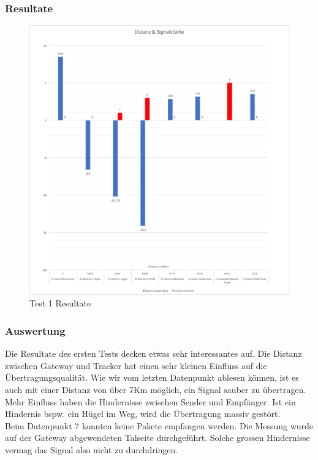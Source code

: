\documentclass[11pt,english,german]{report}
\theoremstyle{definition}
\begin{document}
\subsubsection{Resultate}
\begin{figure}[H]
	\centering
	\includegraphics[width=\textwidth]{img/testing/testing3_lostpackets.png}
	\caption[Test 1 Resultate]
	{Test 1 Resultate}
\end{figure}

\newpage
\subsubsection{Auswertung}
Die Resultate des ersten Tests decken etwas sehr interessantes auf. Die Distanz zwischen Gateway und Tracker hat einen sehr kleinen Einfluss auf die Übertragungsqualität. Wie wir vom letzten Datenpunkt ablesen können, ist es auch mit einer Distanz von über 7Km möglich, ein Signal sauber zu übertragen. Mehr Einfluss haben die Hindernisse zwischen Sender und Empfänger. Ist ein Hindernis bspw. ein Hügel im Weg, wird die Übertragung massiv gestört.\\[0.3cm]
Beim Datenpunkt 7 konnten keine Pakete empfangen werden. Die Messung wurde auf der Gateway abgewendeten Talseite durchgeführt. Solche grossen Hindernisse vermag das Signal also nicht zu durchdringen.
\end{document}
